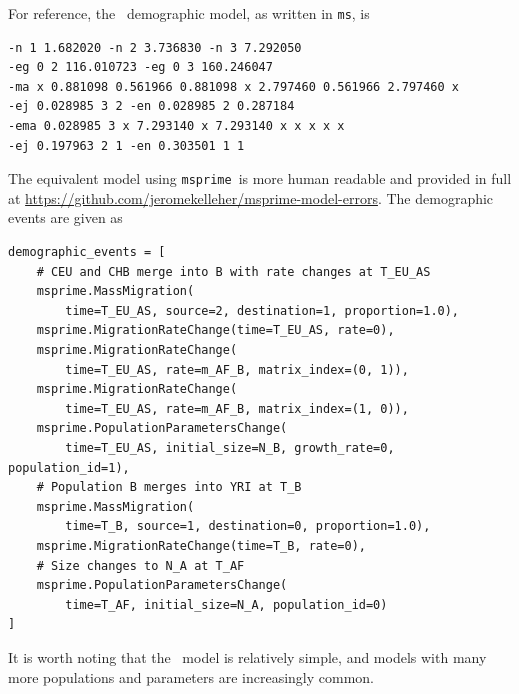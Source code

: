 \documentclass{article}
\newcommand{\msprime}[0]{\texttt{msprime}}
\newcommand{\ms}[0]{\texttt{ms}}
\begin{document}
For reference, the~\citet{gutenkunst2009inferring} demographic model, as written in \ms, is
\begin{lstlisting}[frame=single]
-n 1 1.682020 -n 2 3.736830 -n 3 7.292050
-eg 0 2 116.010723 -eg 0 3 160.246047
-ma x 0.881098 0.561966 0.881098 x 2.797460 0.561966 2.797460 x
-ej 0.028985 3 2 -en 0.028985 2 0.287184
-ema 0.028985 3 x 7.293140 x 7.293140 x x x x x
-ej 0.197963 2 1 -en 0.303501 1 1
\end{lstlisting}
The equivalent model using \msprime\ is more human readable and provided in full at
\url{https://github.com/jeromekelleher/msprime-model-errors}. The demographic events
are given as
\begin{lstlisting}[frame=single]
demographic_events = [
    # CEU and CHB merge into B with rate changes at T_EU_AS
    msprime.MassMigration(
        time=T_EU_AS, source=2, destination=1, proportion=1.0),
    msprime.MigrationRateChange(time=T_EU_AS, rate=0),
    msprime.MigrationRateChange(
        time=T_EU_AS, rate=m_AF_B, matrix_index=(0, 1)),
    msprime.MigrationRateChange(
        time=T_EU_AS, rate=m_AF_B, matrix_index=(1, 0)),
    msprime.PopulationParametersChange(
        time=T_EU_AS, initial_size=N_B, growth_rate=0, population_id=1),
    # Population B merges into YRI at T_B
    msprime.MassMigration(
        time=T_B, source=1, destination=0, proportion=1.0),
    msprime.MigrationRateChange(time=T_B, rate=0),
    # Size changes to N_A at T_AF
    msprime.PopulationParametersChange(
        time=T_AF, initial_size=N_A, population_id=0)
]
\end{lstlisting}
It is worth noting that the~\citet{gutenkunst2009inferring} model is relatively
simple, and models with many more populations and parameters are increasingly
common.




\pagebreak
\end{document}
